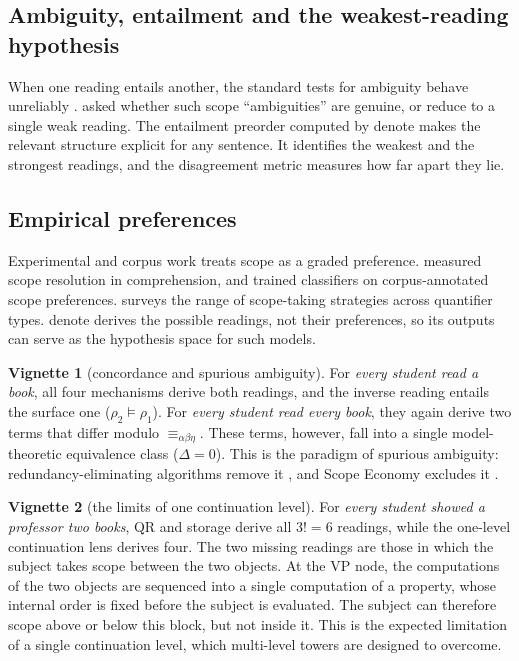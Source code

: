 \documentclass[11pt,a4paper]{article}
\newcommand{\dn}{\textsf{denote}}
\theoremstyle{definition}
\newtheorem{vignette}{Vignette}
\begin{document}
\subsection{Ambiguity, entailment and the weakest-reading hypothesis}
When one reading entails another, the standard tests for ambiguity behave unreliably \citep{zwickysadock1975}. \citet{kempsoncormack1981} asked whether such scope ``ambiguities'' are genuine, or reduce to a single weak reading. The entailment preorder computed by \dn{} makes the relevant structure explicit for any sentence. It identifies the weakest and the strongest readings, and the disagreement metric measures how far apart they lie.

\subsection{Empirical preferences}
Experimental and corpus work treats scope as a graded preference. \citet{kurtzmanmacdonald1993} measured scope resolution in comprehension, and \citet{higginssadock2003} trained classifiers on corpus-annotated scope preferences. \citet{szabolcsi2010} surveys the range of scope-taking strategies across quantifier types. \dn{} derives the possible readings, not their preferences, so its outputs can serve as the hypothesis space for such models.

\begin{vignette}[concordance and spurious ambiguity]\label{v:spurious}
For \textit{every student read a book}, all four mechanisms derive both readings, and the inverse reading entails the surface one ($\rho_2\models\rho_1$). For \textit{every student read every book}, they again derive two terms that differ modulo $\equiv_{\alpha\beta\eta}$. These terms, however, fall into a single model-theoretic equivalence class ($\Delta=0$). This is the paradigm of spurious ambiguity: redundancy-eliminating algorithms remove it \citep{vestre1991}, and Scope Economy excludes it \citep{fox2000}.
\end{vignette}

\begin{vignette}[the limits of one continuation level]\label{v:cont}
For \textit{every student showed a professor two books}, QR and storage derive all $3!=6$ readings, while the one-level continuation lens derives four. The two missing readings are those in which the subject takes scope between the two objects. At the VP node, the computations of the two objects are sequenced into a single computation of a property, whose internal order is fixed before the subject is evaluated. The subject can therefore scope above or below this block, but not inside it. This is the expected limitation of a single continuation level, which multi-level towers \citep{barkershan2014} are designed to overcome.
\end{vignette}
\end{document}
